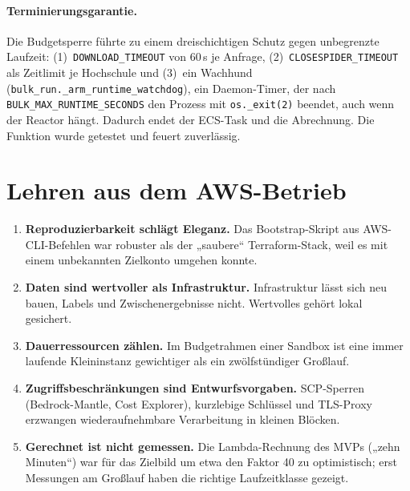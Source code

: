 
\paragraph{Terminierungsgarantie.} Die Budgetsperre führte zu einem dreischichtigen Schutz gegen unbegrenzte Laufzeit: (1)~\texttt{DOWNLOAD\_TIMEOUT} von 60\,s je Anfrage, (2)~\texttt{CLOSESPIDER\_TIMEOUT} als Zeitlimit je Hochschule und (3)~ein Wachhund (\texttt{bulk\_run.\_arm\_runtime\_watchdog}), ein Daemon-Timer, der nach \texttt{BULK\_MAX\_RUNTIME\_SECONDS} den Prozess mit \texttt{os.\_exit(2)} beendet, auch wenn der Reactor hängt. Dadurch endet der ECS-Task und die Abrechnung. Die Funktion wurde getestet und feuert zuverlässig.

\section{Lehren aus dem AWS-Betrieb}
\begin{enumerate}
  \item \textbf{Reproduzierbarkeit schlägt Eleganz.} Das Bootstrap-Skript aus AWS-CLI-Befehlen war robuster als der „saubere“ Terraform-Stack, weil es mit einem unbekannten Zielkonto umgehen konnte.
  \item \textbf{Daten sind wertvoller als Infrastruktur.} Infrastruktur lässt sich neu bauen, Labels und Zwischenergebnisse nicht. Wertvolles gehört lokal gesichert.
  \item \textbf{Dauerressourcen zählen.} Im Budgetrahmen einer Sandbox ist eine immer laufende Kleininstanz gewichtiger als ein zwölfstündiger Großlauf.
  \item \textbf{Zugriffsbeschränkungen sind Entwurfsvorgaben.} SCP-Sperren (Bedrock-Mantle, Cost Explorer), kurzlebige Schlüssel und TLS-Proxy erzwangen wiederaufnehmbare Verarbeitung in kleinen Blöcken.
  \item \textbf{Gerechnet ist nicht gemessen.} Die Lambda-Rechnung des MVPs („zehn Minuten“) war für das Zielbild um etwa den Faktor 40 zu optimistisch; erst Messungen am Großlauf haben die richtige Laufzeitklasse gezeigt.
\end{enumerate}
